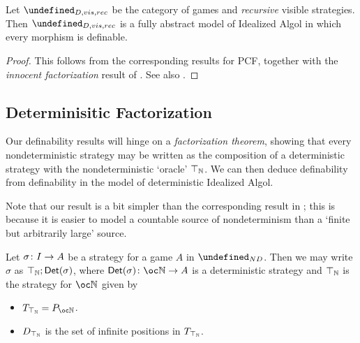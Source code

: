 \documentclass[sigplan,10pt,review]{acmart}\settopmatter{printfolios=true,printccs=false,printacmref=false}
\let\G\undefined
\begin{document}
\begin{proposition}
  Let $\G_{D,vis,rec}$ be the category of games and \emph{recursive} visible strategies.  
  Then $\G_{D,vis,rec}$ is a fully abstract model of Idealized Algol in which every morphism is definable.
\end{proposition}
\begin{proof}
  This follows from the corresponding results for PCF, together with the \emph{innocent factorization} result of \cite{SamsonGuyIAPassive}.  
  See also \cite{MurawskiUniversality}.
\end{proof}

\subsection{Determinisitic Factorization}

Our definability results will hinge on a \emph{factorization theorem}, showing that every nondeterministic strategy may be written as the composition of a deterministic strategy with the nondeterministic `oracle' $\top_{\mathbb{N}}$.  
We can then deduce definability from definability in the model of deterministic Idealized Algol.

Note that our result is a bit simpler than the corresponding result in \cite{mcCHFiniteND}; this is because it is easier to model a countable source of nondeterminism than a `finite but arbitrarily large' source.

\begin{proposition}
  Let $\sigma\colon I \to A$ be a strategy for a game $A$ in $\G_{ND}$.
  Then we may write $\sigma$ as $\top_{\mathbb{N}};\mathsf{Det}(\sigma)$, where $\Det(\sigma)\from \oc\bN\to A$ is a deterministic strategy and $\top_{\mathbb{N}}$ is the strategy for $\oc\bN$ given by
  \begin{itemize}
    \item $T_{\top_{\bN}}=P_{\oc\bN}$.
    \item $D_{\top_{\mathbb{N}}}$ is the set of infinite positions in $T_{\top_{\mathbb{N}}}$.
  \end{itemize}
\end{proposition}
\end{document}
